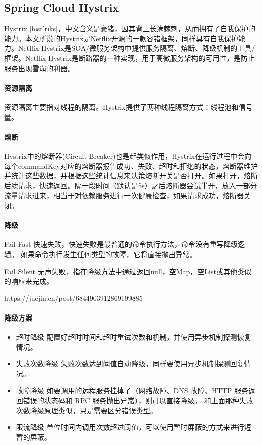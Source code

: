 \documentclass[../../../interview-questions.tex]{subfiles}
\begin{document}
\subsection{Spring Cloud Hystrix}

Hystrix [hɪst'rɪks]，中文含义是豪猪，因其背上长满棘刺，从而拥有了自我保护的能力。本文所说的Hystrix是Netflix开源的一款容错框架，同样具有自我保护能力。Netflix Hystrix是SOA/微服务架构中提供服务隔离、熔断、降级机制的工具/框架。Netflix Hystrix是断路器的一种实现，用于高微服务架构的可用性，是防止服务出现雪崩的利器。


\paragraph{资源隔离}

资源隔离主要指对线程的隔离。Hystrix提供了两种线程隔离方式：线程池和信号量。

\paragraph{熔断}

Hystrix中的熔断器(Circuit Breaker)也是起类似作用，Hystrix在运行过程中会向每个commandKey对应的熔断器报告成功、失败、超时和拒绝的状态，熔断器维护并统计这些数据，并根据这些统计信息来决策熔断开关是否打开。如果打开，熔断后续请求，快速返回。隔一段时间（默认是5s）之后熔断器尝试半开，放入一部分流量请求进来，相当于对依赖服务进行一次健康检查，如果请求成功，熔断器关闭。


\paragraph{降级}

Fail Fast 快速失败，快速失败是最普通的命令执行方法，命令没有重写降级逻辑。 如果命令执行发生任何类型的故障，它将直接抛出异常。

Fail Silent 无声失败，指在降级方法中通过返回null，空Map，空List或其他类似的响应来完成。

https://juejin.cn/post/6844903912869199885

\paragraph{降级方案}

\begin{itemize}
    \item {超时降级} 配置好超时时间和超时重试次数和机制，并使用异步机制探测恢复情况。
    \item {失败次数降级} 失败次数达到阈值自动降级，同样要使用异步机制探测回复情况。
    \item {故障降级} 如要调用的远程服务挂掉了（网络故障、DNS 故障、HTTP 服务返回错误的状态码和 RPC 服务抛出异常），则可以直接降级。
    和上面那种失败次数降级原理类似，只是需要区分错误类型。
    \item {限流降级} 单位时间内调用次数超过阈值，可以使用暂时屏蔽的方式来进行短暂的屏蔽。
\end{itemize}
\end{document}
